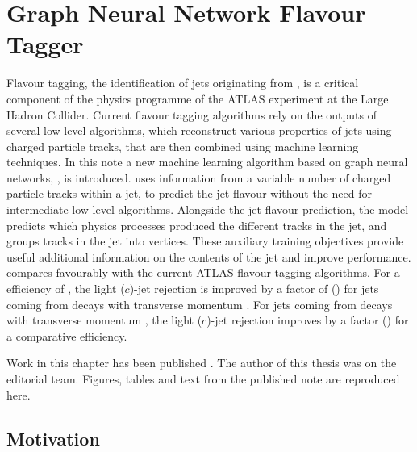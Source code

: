 \chapter{Graph Neural Network Flavour Tagger}\label{chap:gnn_tagger}

Flavour tagging, the identification of jets originating from \bcquarks, is a critical component of the physics programme of the ATLAS experiment at the Large Hadron Collider. 
Current flavour tagging algorithms rely on the outputs of several low-level algorithms, which reconstruct various properties of jets using charged particle tracks, that are then combined using machine learning techniques.
In this note a new machine learning algorithm based on graph neural networks, \GNN, is introduced.
\GNN uses information from a variable number of charged particle tracks within a jet, to predict the jet flavour without the need for intermediate low-level algorithms.
Alongside the jet flavour prediction, the model predicts which physics processes produced the different tracks in the jet, and groups tracks in the jet into vertices.
These auxiliary training objectives provide useful additional information on the contents of the jet and improve performance.
\GNN compares favourably with the current ATLAS flavour tagging algorithms.
For a \bjet efficiency of , the light ($c$)-jet rejection is improved by a factor of \ttbllo (\ttbclo) for jets coming from \ttbar decays with transverse momentum \ttbarpt.
For jets coming from \Zprime decays with transverse momentum \Zprimept, the light ($c$)-jet rejection improves by a factor \zpbllo (\zpbclo) for a comparative  \bjet efficiency.

Work in this chapter has been published \cite{ATL-PHYS-PUB-2022-027}.
The author of this thesis was on the editorial team.
Figures, tables and text from the published note are reproduced here.


\section{Motivation}\label{sec:gnn_motvation}


\newcommand{\fakesfootnote}{%
A fake track is defined as a track with a truth-matching probability less than $0.5$, where the truth-matching probability is defined in Ref.~\cite{PERF-2015-08}.
}

